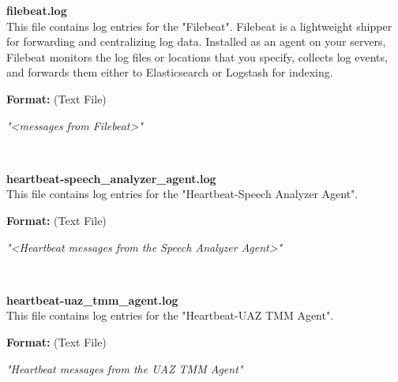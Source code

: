 \begin{description}
\begin{addmargin}[0em]{0em}
    \label{filebeat.log}
    \begin{addmargin}[1em]{0em} %
        \textbf{filebeat.log}\\
        This file contains log entries for the "Filebeat".
        Filebeat is a lightweight shipper for forwarding and centralizing log data. Installed as an agent on your servers,
        Filebeat monitors the log files or locations that you specify, collects log events,
        and forwards them either to Elasticsearch or Logstash for indexing.
        \begin{addmargin}[1em]{0em}
            \textbf{Format:} (Text File)
            \begin{addmargin}[1em]{0em}
                \textit{"<messages from Filebeat>"}
            \end{addmargin}
        \end{addmargin}
    \end{addmargin} %
    \textbf{\\}

    \label{heartbeat-speech_analyzer_agent.log}
    \begin{addmargin}[1em]{0em} %
        \textbf{heartbeat-speech\_analyzer\_agent.log}\\
        This file contains log entries for the "Heartbeat-Speech Analyzer Agent".
        \begin{addmargin}[1em]{0em}
            \textbf{Format:} (Text File)
            \begin{addmargin}[1em]{0em}
                \textit{"<Heartbeat messages from the Speech Analyzer Agent>"}
            \end{addmargin}
        \end{addmargin}
    \end{addmargin} %
    \textbf{\\}

    \label{heartbeat-uaz_tmm_agent.log}
    \begin{addmargin}[1em]{0em} %
        \textbf{heartbeat-uaz\_tmm\_agent.log}\\
        This file contains log entries for the "Heartbeat-UAZ TMM Agent".
        \begin{addmargin}[1em]{0em}
            \textbf{Format:} (Text File)
            \begin{addmargin}[1em]{0em}
                \textit{"Heartbeat messages from the UAZ TMM Agent"}
            \end{addmargin}
        \end{addmargin}
    \end{addmargin} %
    \textbf{\\}


\end{addmargin}
\end{description}
